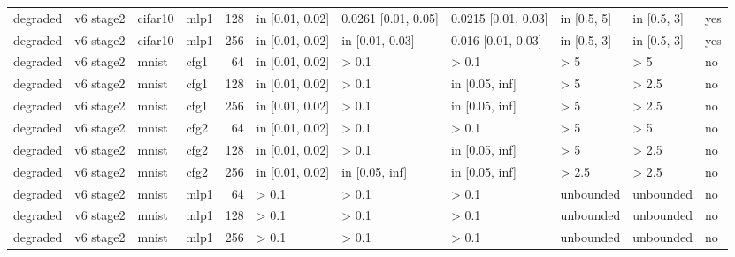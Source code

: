 \begin{table}[htbp]
{\begin{tabular}{@{}llllrllllll@{}}
degraded & v6 stage2 & cifar10 & mlp1 & 128 & in [0.01, 0.02] & 0.0261 [0.01, 0.05] & 0.0215 [0.01, 0.03] & in [0.5, 5] & in [0.5, 3] & yes \\
degraded & v6 stage2 & cifar10 & mlp1 & 256 & in [0.01, 0.02] & in [0.01, 0.03] & 0.016 [0.01, 0.03] & in [0.5, 3] & in [0.5, 3] & yes \\
degraded & v6 stage2 & mnist & cfg1 & 64 & in [0.01, 0.02] & > 0.1 & > 0.1 & > 5 & > 5 & no \\
degraded & v6 stage2 & mnist & cfg1 & 128 & in [0.01, 0.02] & > 0.1 & in [0.05, inf] & > 5 & > 2.5 & no \\
degraded & v6 stage2 & mnist & cfg1 & 256 & in [0.01, 0.02] & > 0.1 & in [0.05, inf] & > 5 & > 2.5 & no \\
degraded & v6 stage2 & mnist & cfg2 & 64 & in [0.01, 0.02] & > 0.1 & > 0.1 & > 5 & > 5 & no \\
degraded & v6 stage2 & mnist & cfg2 & 128 & in [0.01, 0.02] & > 0.1 & in [0.05, inf] & > 5 & > 2.5 & no \\
degraded & v6 stage2 & mnist & cfg2 & 256 & in [0.01, 0.02] & in [0.05, inf] & in [0.05, inf] & > 2.5 & > 2.5 & no \\
degraded & v6 stage2 & mnist & mlp1 & 64 & > 0.1 & > 0.1 & > 0.1 & unbounded & unbounded & no \\
degraded & v6 stage2 & mnist & mlp1 & 128 & > 0.1 & > 0.1 & > 0.1 & unbounded & unbounded & no \\
degraded & v6 stage2 & mnist & mlp1 & 256 & > 0.1 & > 0.1 & > 0.1 & unbounded & unbounded & no \\
\bottomrule
\end{tabular}}
\end{table}
